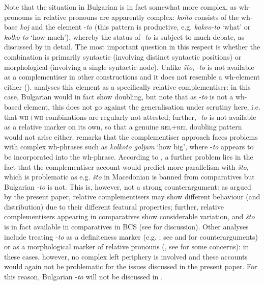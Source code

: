 \documentclass[output=paper]{langscibook}
\begin{document}
Note that the situation in Bulgarian is in fact somewhat more complex, as wh-pronouns in relative pronouns are apparently complex: \textit{koito} consists of the wh-base \textit{koj} and the element -\textit{to} (this pattern is productive, e.g. \textit{kakvo-to} `what' or \textit{kolko-to} `how much'), whereby the status of -\textit{to} is subject to much debate, as discussed by \citet{rudin2014} in detail. The most important question in this respect is whether the combination is primarily syntactic (involving distinct syntactic positions) or morphological (involving a single syntactic node). Unlike \textit{\v{s}to}, -\textit{to} is not available as a complementiser in other constructions and it does not resemble a wh-element either (\citealt[322]{rudin2014}). \citet{rudin2009} analyses this element as a specifically relative complementiser: in this case, Bulgarian would in fact show doubling, but note that as -\textit{to} is not a wh-based element, this does not go against the generalisation under scrutiny here, i.e. that \textsc{wh}$+$\textsc{wh} combinations are regularly not attested; further, -\textit{to} is not available as a relative marker on its own, so that a genuine \textsc{rel}$+$\textsc{rel} doubling pattern would not arise either. \citet[324]{rudin2014} remarks that the complementiser approach faces problems with complex wh-phrases such as \textit{kolkoto goljam} `how big', where -\textit{to} appears to be incorporated into the wh-phrase. According to \citet{rudin2014}, a further problem lies in the fact that the complementiser account would predict more parallelism with \textit{\v{s}to}, which is problematic as e.g. \textit{\v{s}to} in Macedonian is banned from comparatives but Bulgarian -\textit{to} is not. This is, however, not a strong counterargument: as argued by the present paper, relative complementisers may show different behaviour (and distribution) due to their different featural properties; further, relative complementisers appearing in comparatives show considerable variation, and \textit{\v{s}to} is in fact available in comparatives in BCS (see \citealt{bacskaiatkari2016alh} for discussion). Other analyses include treating -\textit{to} as a definiteness marker (e.g. \citealt{izvorski2000}; see \citealt{rudin2009} and \citealt[322--323]{rudin2014} for counterarguments) or as a morphological marker of relative pronouns (\citealt{hauge1999}, see \citealt[325]{rudin2014} for some concerns): in these cases, however, no complex left periphery is involved and these accounts would again not be problematic for the issues discussed in the present paper. For this reason, Bulgarian -\textit{to} will not be discussed in .
\end{document}
